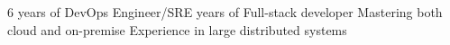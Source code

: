 \documentclass[9pt]{developercv} %
\begin{document}
\vspace{0.5cm}



\begin{minipage}[t]{0.4\textwidth} %
	\vspace{-\baselineskip} %
    6 years of DevOps Engineer/SRE\newline{} years of Full-stack developer\newline\newline
    Mastering both cloud and on-premise\newline\newline
    Experience in large distributed systems\newline\newline
\end{minipage}
\hfill %
\begin{minipage}[t]{0.5\textwidth} %
	\vspace{-\baselineskip} %
	\begin{barchart}{5.5}
	\end{barchart}
\end{minipage}


\end{document}
